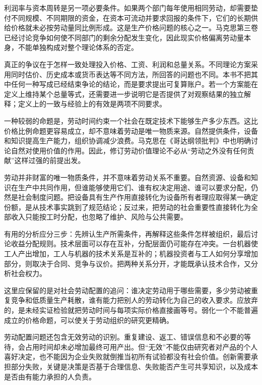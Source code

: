 \documentclass[UTF8,fontset=fandol,zihao=-4,oneside,openany]{ctexbook}
\begin{document}
\label{arg:P041}
利润率与资本周转是另一项必要条件。如果两个部门每年使用相同劳动，却需要垫付不同规模、不同期限的资金，在资本可流动并要求回报的条件下，它们的长期供给价格就未必按劳动量同比例形成。这是生产价格问题的核心之一。马克思第三卷已经讨论竞争如何使不同部门的剩余分配发生变化，因此现实价格偏离劳动量本身，不能单独构成对整个理论体系的否定。\cite{MarxPrice}

真正的争议在于怎样一致处理投入价格、工资、利润和总量关系。不同理论方案采用同时估价、历史成本或货币表达等不同方法，所回答的问题也不同。本书不把其中任何一种写成已经结束争论的结论，而是要求提出可复算账户。若一个方案能在定义上维持某个总量等式，还需要进一步说明它是否提供了对观察结果的独立解释；定义上的一致与经验上的有效是两项不同要求。

一种较弱的命题是，劳动时间约束一个社会在既定技术下能够生产多少东西。这比价格比例命题更容易成立，却不意味着劳动是唯一物质来源。自然提供条件，设备和知识提高生产能力，组织协调减少浪费。马克思在《哥达纲领批判》中也明确讨论自然对使用价值的作用。因此，修订劳动价值理论不必从“劳动之外没有任何贡献”这样过强的前提出发。\cite{Gotha}

\label{arg:P042}
劳动并非财富的唯一物质条件，并不意味着劳动关系不重要。自然资源、设备和知识在生产中共同作用，但谁能够使用它们、谁有权决定用途、谁可以要求分配，仍然是社会制度问题。把设备具有生产作用直接转化为设备所有者理应取得某一确定份额，是从技术事实跳到了规范结论；反过来，把劳动的社会重要性直接转化为全部收入只能按工时分配，也忽略了维护、风险与公共需要。

有用的分析应分三步：先辨认生产所需条件，再解释这些条件怎样被组织，最后讨论收益分配规则。技术层面可以存在互补，分配层面仍可能存在冲突。一台机器使工人产出增加，工人与机器的技术关系是互补的；机器投资者与工人如何分享增加部分，则取决于合同、竞争与议价。把两种关系分开，才能既承认技术合作，又分析社会权力。

这里应保留的是对社会劳动配置的追问：谁决定劳动用于哪些需要，多少劳动被重复竞争和低质量生产耗散，谁有能力把别人的劳动转化为自己的收入要求。应放弃的，是未经实证检验就把劳动时间与每项实际价格直接画等号。弱化一个不能普遍成立的价格命题，可以使关于劳动组织的研究更精确。

\label{arg:P043}
劳动配置问题还包含无效劳动的识别。重复建设、返工、错误信息和不必要的等待，会占用时间却未必增加最终可用产出。但“无效”不能仅由研究者对产品的个人喜好决定，也不能因为企业失败就倒推当初所有试验都没有社会价值。创新需要承担部分失败，关键是决策是否基于合理信息、失败能否产生可共享知识，以及成本是否由有能力承担的人负责。
\end{document}
